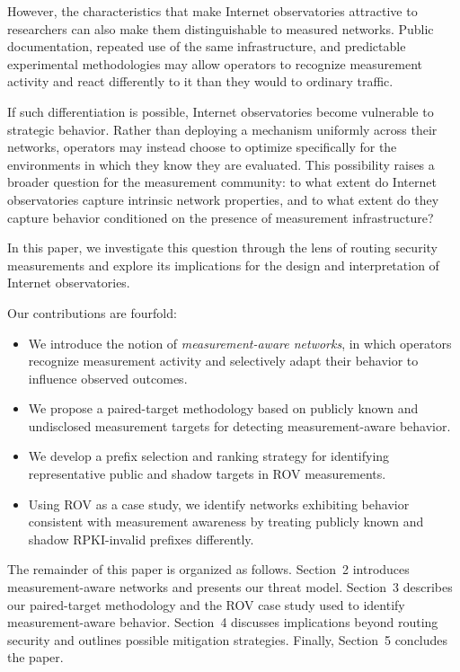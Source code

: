 \documentclass[sigconf, 10pt, anonymous, nonacm]{acmart}
\begin{document}
However, the characteristics that make Internet observatories attractive to researchers can also make them distinguishable to measured networks. Public documentation, repeated use of the same infrastructure, and predictable experimental methodologies may allow operators to recognize measurement activity and react differently to it than they would to ordinary traffic.

If such differentiation is possible, Internet observatories become vulnerable to strategic behavior. Rather than deploying a mechanism uniformly across their networks, operators may instead choose to optimize specifically for the environments in which they know they are evaluated. This possibility raises a broader question for the measurement community: to what extent do Internet observatories capture intrinsic network properties, and to what extent do they capture behavior conditioned on the presence of measurement infrastructure?

In this paper, we investigate this question through the lens of routing security measurements and explore its implications for the design and interpretation of Internet observatories.

Our contributions are fourfold:

\begin{itemize}

\item We introduce the notion of \emph{measurement-aware networks}, in which operators recognize measurement activity and selectively adapt their behavior to influence observed outcomes.

\item We propose a paired-target methodology based on publicly known and undisclosed measurement targets for detecting measurement-aware behavior.

\item We develop a prefix selection and ranking strategy for identifying representative public and shadow targets in ROV measurements.

\item Using ROV as a case study, we identify networks exhibiting behavior consistent with measurement awareness by treating publicly known and shadow RPKI-invalid prefixes differently.

\end{itemize}

The remainder of this paper is organized as follows. Section~2 introduces measurement-aware networks and presents our threat model. Section~3 describes our paired-target methodology and the ROV case study used to identify measurement-aware behavior. Section~4 discusses implications beyond routing security and outlines possible mitigation strategies. Finally, Section~5 concludes the paper.
\end{document}
